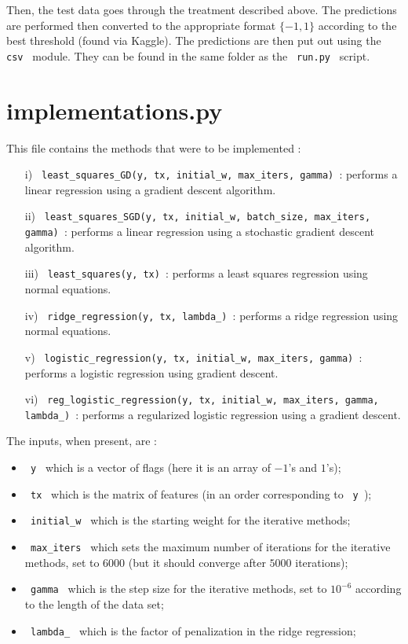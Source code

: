 \documentclass[11pt, oneside]{article}   	%
\begin{document}
Then, the test data goes through the treatment described above. The predictions are performed then converted to the appropriate format $ \{ -1, 1 \}$ according to the best threshold (found via Kaggle). The predictions are then put out using the \lstinline" csv " module. They can be found in the same folder as the \lstinline" run.py " script.

\section{implementations.py} \label{impl}

This file contains the methods that were to be implemented : 
\begin{itemize}
\item[i)] \lstinline" least_squares_GD(y, tx, initial_w, max_iters, gamma) ": performs a linear regression using a gradient descent algorithm. 
\item[ii)] \lstinline" least_squares_SGD(y, tx, initial_w, batch_size, max_iters, gamma) ": performs a linear regression using a stochastic gradient descent algorithm.
\item[iii)] \lstinline" least_squares(y, tx) ": performs a least squares regression using normal equations.
\item[iv)] \lstinline" ridge_regression(y, tx, lambda_) ": performs a ridge regression using normal equations.
\item[v)] \lstinline" logistic_regression(y, tx, initial_w, max_iters, gamma) ": performs a logistic regression using gradient descent.
\item[vi)] \lstinline" reg_logistic_regression(y, tx, initial_w, max_iters, gamma, lambda_) ": performs a regularized logistic regression using a gradient descent.
\end{itemize}
The inputs, when present, are : 
\begin{itemize}
\item \lstinline" y " which is a vector of flags (here it is an array of $-1$'s and $1$'s); 
\item \lstinline" tx " which is the matrix of features (in an order corresponding to \lstinline" y ");
\item \lstinline" initial_w " which is the starting weight for the iterative methods;
\item \lstinline" max_iters " which sets the maximum number of iterations for the iterative methods, set to $6000$ (but it should converge after $5000$ iterations);
\item \lstinline" gamma " which is the step size for the iterative methods, set to $10^{-6}$ according to the length of the data set;
\item \lstinline" lambda_ " which is the factor of penalization in the ridge regression;
\end{itemize}
\end{document}
